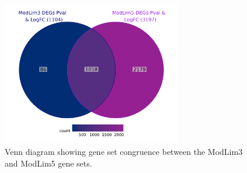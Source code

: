 \vspace{1.5cm}
\begin{figure}[!h]
\centering
\includegraphics[width=0.7\textwidth]{../figures/Chapter_4/Venn_3State_5State.png}
\caption{Venn diagram showing gene set congruence between the ModLim3 and ModLim5 gene sets.}
\label{fig:VD_Compare}
\end{figure}
\vfill
\newpage 


